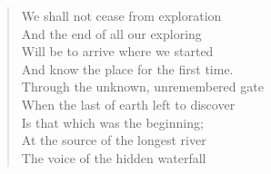 
\begin{verse}
We shall not cease from exploration  \\
And the end of all our exploring  \\
Will be to arrive where we started  \\
And know the place for the first time. 
 \\
Through the unknown, unremembered gate  \\
When the last of earth left to discover  \\
Is that which was the beginning;  \\
At the source of the longest river  \\
The voice of the hidden waterfall \\
\end{verse}

